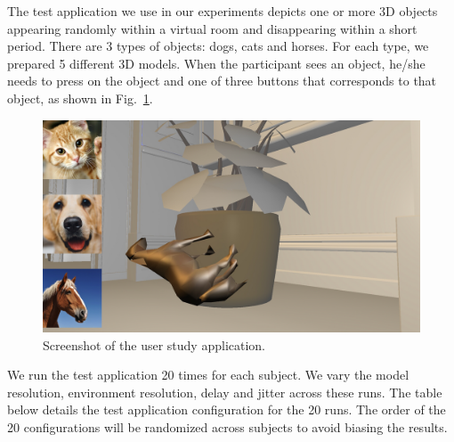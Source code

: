The test application we use in our experiments depicts one or more 3D objects appearing randomly within a virtual room and disappearing within a short period.  There are 3 types of objects: dogs, cats and horses. For each type, we prepared 5 different 3D models. When the participant sees an object, he/she needs to press on the object and one of three buttons that corresponds to that object, as shown in Fig.~\ref{fig:us}.

\begin{figure}[!htbp]
	\centering
	\includegraphics[width=\columnwidth]{figures/user_study.png}
	\caption{Screenshot of the user study application.}
	\label{fig:us}
\end{figure}

We run the test application 20 times for each subject. We vary the model resolution, environment resolution, delay and  jitter across these runs. The table below details the test application configuration for the 20 runs. The order of the 20 configurations will be randomized across subjects to avoid biasing the results.

